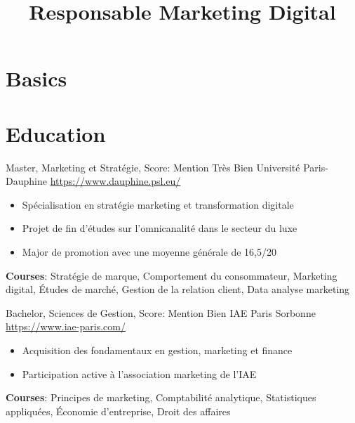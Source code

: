 \documentclass[a4paper, serif, 10pt]{moderncv}
\title{Responsable Marketing Digital}
\begin{document}
\maketitle

\section{Basics}

\section{Education}

        {Master, Marketing et Stratégie, Score: Mention Très Bien}
        {Université Paris-Dauphine}
        {\url{https://www.dauphine.psl.eu/}}
        {}
        {\begin{itemize}
\item Spécialisation en stratégie marketing et transformation digitale
\item Projet de fin d'études sur l'omnicanalité dans le secteur du luxe
\item Major de promotion avec une moyenne générale de 16,5/20
\end{itemize}
\textbf{Courses}: Stratégie de marque, Comportement du consommateur, Marketing digital, Études de marché, Gestion de la relation client, Data analyse marketing}

        {Bachelor, Sciences de Gestion, Score: Mention Bien}
        {IAE Paris Sorbonne}
        {\url{https://www.iae-paris.com/}}
        {}
        {\begin{itemize}
\item Acquisition des fondamentaux en gestion, marketing et finance
\item Participation active à l'association marketing de l'IAE
\end{itemize}
\textbf{Courses}: Principes de marketing, Comptabilité analytique, Statistiques appliquées, Économie d'entreprise, Droit des affaires}
\end{document}
